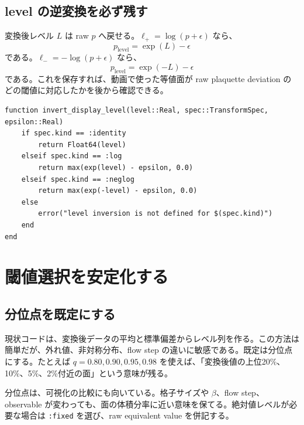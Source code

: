 \documentclass[uplatex,dvipdfmx,ja=standard,11pt,a4paper]{bxjsarticle}
\newcommand{\code}[1]{\texttt{#1}}
\begin{document}
\subsection{level の逆変換を必ず残す}
変換後レベル \(L\) は raw \(p\) へ戻せる。\(\ell_+=\log(p+\epsilon)\) なら、
\begin{equation}
  p_{\mathrm{level}}=\exp(L)-\epsilon
\end{equation}
である。\(\ell_-=-\log(p+\epsilon)\) なら、
\begin{equation}
  p_{\mathrm{level}}=\exp(-L)-\epsilon
\end{equation}
である。これを保存すれば、動画で使った等値面が raw plaquette deviation のどの閾値に対応したかを後から確認できる。

\begin{lstlisting}[style=julia,caption={レベル逆変換の純粋関数案}]
function invert_display_level(level::Real, spec::TransformSpec, epsilon::Real)
    if spec.kind == :identity
        return Float64(level)
    elseif spec.kind == :log
        return max(exp(level) - epsilon, 0.0)
    elseif spec.kind == :neglog
        return max(exp(-level) - epsilon, 0.0)
    else
        error("level inversion is not defined for $(spec.kind)")
    end
end
\end{lstlisting}

\section{閾値選択を安定化する}
\subsection{分位点を既定にする}
現状コードは、変換後データの平均と標準偏差からレベル列を作る\cite{VisualizingVisualization}。この方法は簡単だが、外れ値、非対称分布、flow step の違いに敏感である。既定は分位点にする。たとえば \(q=0.80,0.90,0.95,0.98\) を使えば、「変換後値の上位20\%、10\%、5\%、2\%付近の面」という意味が残る。

分位点は、可視化の比較にも向いている。格子サイズや \(\beta\)、flow step、observable が変わっても、面の体積分率に近い意味を保てる。絶対値レベルが必要な場合は \code{:fixed} を選び、raw equivalent value を併記する。
\end{document}
